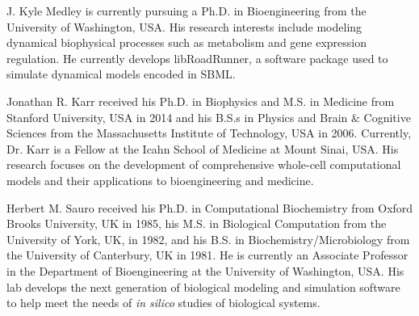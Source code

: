 \documentclass[journal,transmag,twoside]{IEEEtran}
\begin{document}
\begin{IEEEbiography}{J. Kyle Medley}
is currently pursuing a Ph.D. in Bioengineering from the University of Washington, USA.
His research interests include modeling dynamical biophysical processes such as
metabolism and gene expression regulation.
He currently develops libRoadRunner, a software package used to simulate dynamical models encoded in SBML.
\end{IEEEbiography}

\begin{IEEEbiography}{Jonathan R. Karr}
received his Ph.D. in Biophysics and M.S. in Medicine from Stanford University, USA in 2014 and his B.S.s in Physics and Brain \& Cognitive Sciences from the Massachusetts Institute of Technology, USA in 2006. Currently, Dr. Karr is a Fellow at the Icahn School of Medicine at Mount Sinai, USA. His research focuses on the development of comprehensive whole-cell computational models and their applications to bioengineering and medicine.
\end{IEEEbiography}

\begin{IEEEbiography}{Herbert M. Sauro}
received his Ph.D. in Computational Biochemistry from Oxford Brooks University, UK in 1985, his M.S. in Biological Computation from the University of York, UK, in 1982, and his B.S. in Biochemistry/Microbiology from the University of Canterbury, UK in 1981. He is currently an Associate Professor in the Department of Bioengineering at the University of Washington, USA. His lab develops the next generation of biological modeling and simulation software to help meet the needs of \textit{in silico} studies of biological systems.
\end{IEEEbiography}

\vfill
\end{document}

